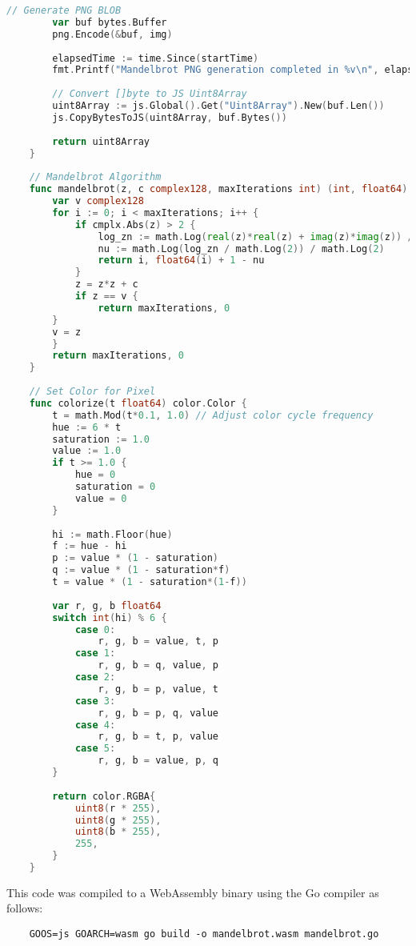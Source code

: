 \begin{lstlisting}[language=go, frame=tb, caption={Mandelbrot Set Calculation (WASM build)}]
        // Generate PNG BLOB
        var buf bytes.Buffer
        png.Encode(&buf, img)
    
        elapsedTime := time.Since(startTime)
        fmt.Printf("Mandelbrot PNG generation completed in %v\n", elapsedTime)
    
        // Convert []byte to JS Uint8Array
        uint8Array := js.Global().Get("Uint8Array").New(buf.Len())
        js.CopyBytesToJS(uint8Array, buf.Bytes())
    
        return uint8Array
    }
    
    // Mandelbrot Algorithm
    func mandelbrot(z, c complex128, maxIterations int) (int, float64) {
        var v complex128
        for i := 0; i < maxIterations; i++ {
            if cmplx.Abs(z) > 2 {
                log_zn := math.Log(real(z)*real(z) + imag(z)*imag(z)) / 2
                nu := math.Log(log_zn / math.Log(2)) / math.Log(2)
                return i, float64(i) + 1 - nu
            }
            z = z*z + c
            if z == v {
                return maxIterations, 0
        }
        v = z
        }
        return maxIterations, 0
    }
    
    // Set Color for Pixel
    func colorize(t float64) color.Color {
        t = math.Mod(t*0.1, 1.0) // Adjust color cycle frequency
        hue := 6 * t
        saturation := 1.0
        value := 1.0
        if t >= 1.0 {
            hue = 0
            saturation = 0
            value = 0
        }
    
        hi := math.Floor(hue)
        f := hue - hi
        p := value * (1 - saturation)
        q := value * (1 - saturation*f)
        t = value * (1 - saturation*(1-f))
    
        var r, g, b float64
        switch int(hi) % 6 {
            case 0:
                r, g, b = value, t, p
            case 1:
                r, g, b = q, value, p
            case 2:
                r, g, b = p, value, t
            case 3:
                r, g, b = p, q, value
            case 4:
                r, g, b = t, p, value
            case 5:
                r, g, b = value, p, q
        }
    
        return color.RGBA{
            uint8(r * 255),
            uint8(g * 255),
            uint8(b * 255),
            255,
        }
    }    
\end{lstlisting}

This code was compiled to a WebAssembly binary using the Go \cite{methodology:go} compiler as follows:
\begin{lstlisting}
    GOOS=js GOARCH=wasm go build -o mandelbrot.wasm mandelbrot.go
\end{lstlisting}


